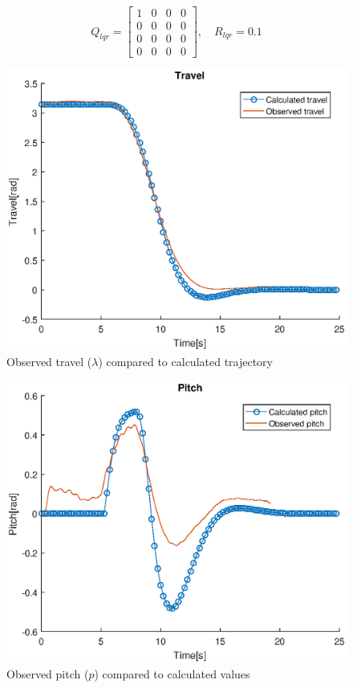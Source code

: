 \begin{equation}
{Q_{lqr}} = \left[ {\begin{array}{*{20}{c}}
{1}&0&0&0\\
0&0&0&0\\
0&0&0&0\\
0&0&0&0
\end{array}} \right],\quad {R_{lqr}} = 0.1
\end{equation}


\begin{figure}[H]
\includegraphics[scale=0.73]{data_10.3/10_3_travel_opt_and_observed} 
\centering
\caption{Observed travel ($\lambda$) compared to calculated trajectory}\label{fig:figur9}
\end{figure}

\begin{figure}[H]
\includegraphics[scale=0.73]{data_10.3/10_3_pitch_opt_and_observed} 
\centering
\caption{Observed pitch ($p$) compared to calculated values}\label{fig:figur9}
\end{figure}

